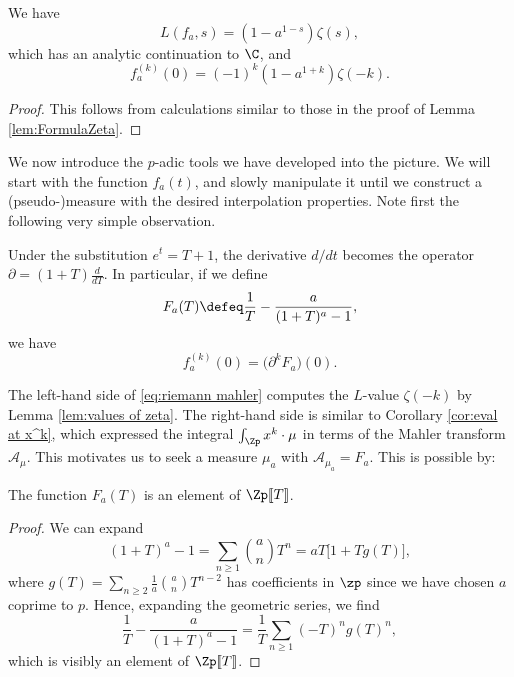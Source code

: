 \documentclass[a4paper,10pt, english, reqno]{smfart}
\newcommand{\lsem}{[\! [}
\newcommand{\rsem}{]\! ]}
\numberwithin{equation}{section}
\begin{document}
\begin{lemma}\label{lem:values of zeta}
We have
\[L(f_a,s) =(1-a^{1-s})\zeta(s),\]
which has an analytic continuation to $\C$, and
\[f_a^{(k)}(0) = (-1)^k(1-a^{1+k})\zeta(-k).\]
\end{lemma}

\begin{proof}
This follows from calculations similar to those in the proof of Lemma \ref{lem:FormulaZeta}.
\end{proof}


We now introduce the $p$-adic tools we have developed into the picture. We will start with the function $f_a(t)$, and slowly manipulate it until we construct a (pseudo-)measure with the desired interpolation properties. Note first the following very simple observation.

\begin{lemma}\label{lem:define F_a}
Under the substitution $e^t = T+1$, the derivative $d/dt$ becomes the operator $\partial = (1+T)\frac{d}{dT}$. In particular, if we define
\[ F_a(T) \defeq \frac{1}{T} - \frac{a}{(1+T)^a - 1},\]
we have
\begin{equation}\label{eq:riemann mahler} 
f_a^{(k)}(0) = \big( \partial^k F_a \big)(0).
\end{equation}
\end{lemma}

The left-hand side of \eqref{eq:riemann mahler} computes the $L$-value $\zeta(-k)$ by Lemma \ref{lem:values of zeta}. The right-hand side is similar to Corollary \ref{cor:eval at x^k}, which expressed the integral $\int_{\Zp} x^k \cdot \mu$ in terms of the Mahler transform $\mathscr{A}_\mu$. This motivates us to seek a measure $\mu_a$ with $\mathscr{A}_{\mu_a} = F_a$. This is possible by: 

\begin{proposition} \label{PropFaT}
The function $F_a(T)$ is an element of $\Zp\lsem T\rsem $.
\end{proposition}

\begin{proof}
We can expand 
\[ (1+T)^a - 1 = \sum_{n\geq 1} {a \choose n} T^n = aT\big[1+Tg(T)\big], \]
where $g(T) = \sum_{n\geq 2}\frac{1}{a} {a \choose n} T^{n-2}$ has coefficients in $\zp$ since we have chosen $a$ coprime to $p$. Hence, expanding the geometric series, we find
\[\frac{1}{T} - \frac{a}{(1+T)^a - 1} = \frac{1}{T} \sum_{n \geq 1}(-T)^n g(T)^n,\]
which is visibly an element of $\Zp\lsem T\rsem $.
\end{proof}
\end{document}
